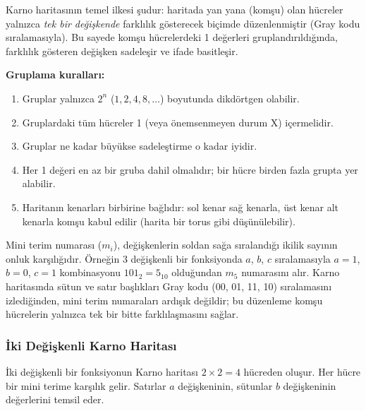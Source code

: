 Karno haritasının temel ilkesi şudur: haritada yan yana (komşu) olan hücreler yalnızca \emph{tek bir değişkende} farklılık gösterecek biçimde düzenlenmiştir (Gray kodu sıralamasıyla). Bu sayede komşu hücrelerdeki 1 değerleri gruplandırıldığında, farklılık gösteren değişken sadeleşir ve ifade basitleşir.

\textbf{Gruplama kuralları:}
\begin{enumerate}[nosep]
    \item Gruplar yalnızca $2^n$ ($1, 2, 4, 8, \ldots$) boyutunda dikdörtgen olabilir.
    \item Gruplardaki tüm hücreler 1 (veya önemsenmeyen durum X) içermelidir.
    \item Gruplar ne kadar büyükse sadeleştirme o kadar iyidir.
    \item Her 1 değeri en az bir gruba dahil olmalıdır; bir hücre birden fazla grupta yer alabilir.
    \item Haritanın kenarları birbirine bağlıdır: sol kenar sağ kenarla, üst kenar alt kenarla komşu kabul edilir (harita bir torus gibi düşünülebilir).
\end{enumerate}

\begin{bilginot}
Mini terim numarası ($m_i$), değişkenlerin soldan sağa sıralandığı ikilik sayının onluk karşılığıdır. Örneğin 3 değişkenli bir fonksiyonda $a$, $b$, $c$ sıralamasıyla $a=1$, $b=0$, $c=1$ kombinasyonu $101_2 = 5_{10}$ olduğundan $m_5$ numarasını alır. Karno haritasında sütun ve satır başlıkları Gray kodu (00, 01, 11, 10) sıralamasını izlediğinden, mini terim numaraları ardışık değildir; bu düzenleme komşu hücrelerin yalnızca tek bir bitte farklılaşmasını sağlar.
\end{bilginot}

\subsubsection{İki Değişkenli Karno Haritası}

İki değişkenli bir fonksiyonun Karno haritası $2 \times 2 = 4$ hücreden oluşur. Her hücre bir mini terime karşılık gelir. Satırlar $a$ değişkeninin, sütunlar $b$ değişkeninin değerlerini temsil eder.

